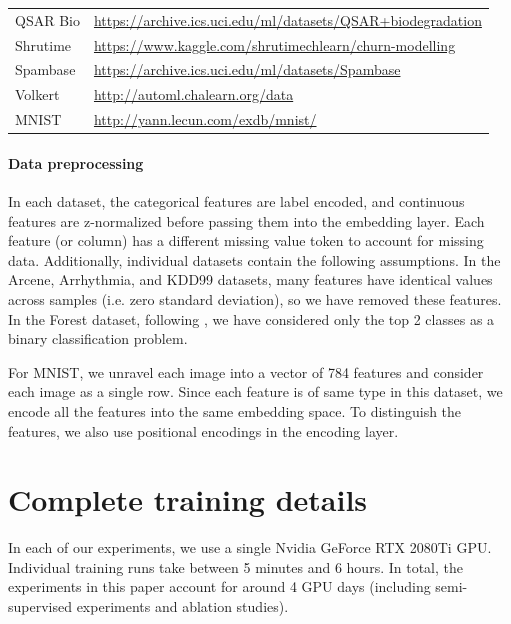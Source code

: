 \begin{table}[h!]
{\begin{tabular}{l | l }
QSAR Bio        & \url{https://archive.ics.uci.edu/ml/datasets/QSAR+biodegradation}                          \\
Shrutime         & \url{https://www.kaggle.com/shrutimechlearn/churn-modelling}                               \\
Spambase         & \url{https://archive.ics.uci.edu/ml/datasets/Spambase}                                     \\
Volkert          & \url{http://automl.chalearn.org/data}                                                      \\
MNIST            & \url{http://yann.lecun.com/exdb/mnist/}     \\
\bottomrule
\end{tabular}
}
\end{table}


\paragraph{Data preprocessing}
In each dataset, the categorical features are label encoded, and continuous features are z-normalized before passing them into the embedding layer. Each feature (or column) has a different missing value token to account for missing data. Additionally, individual datasets contain the following assumptions. In the Arcene, Arrhythmia, and KDD99 datasets, many features have identical values across samples (i.e. zero standard deviation), so we have removed these features. In the Forest dataset, following \cite{arik2019TabNet}, we have considered only the top 2 classes as a binary classification problem.

For MNIST, we unravel each image into a vector of 784 features and consider each image as a single row. Since each feature is of same type in this dataset, we encode all the features into the same embedding space. To distinguish the features, we also use positional encodings in the encoding layer.

\section{Complete training details}
\label{appendix_sec:complete_training_deets}

In each of our experiments, we use a single Nvidia GeForce RTX 2080Ti GPU. Individual training runs take between 5 minutes and 6 hours. In total, the experiments in this paper account for around 4 GPU days (including semi-supervised experiments and ablation studies).

